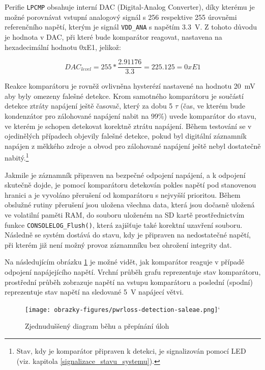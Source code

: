 Perifie \texttt{LPCMP} obsahuje interní DAC (Digital-Analog Converter), díky kterému je možné porovnávat vstupní analogový signál s 256 respektive 255 úrovněmi referenčního napětí, kterým je signál \texttt{VDD\_ANA} s napětím \SI{3.3}{\volt}. Z tohoto důvodu je hodnota v DAC, při které bude komparátor reagovat, nastavena na hexadecimální hodnotu 0xE1, jelikož:

\begin{equation}
    DAC_{level} = 255 * \frac{2.91176}{3.3} = 225.125 = 0xE1
    \label{eq:dac-value}
\end{equation}

Reakce komparátoru je rovněž ovlivněna hysterézí nastavené na hodnotu \SI{20}{\milli\volt} aby byly omezeny falešné detekce. Krom samotného komparátoru je součástí detekce ztráty napájení ještě časovač, který za dobu 5 $\tau$ (čas, ve kterém bude kondenzátor pro zálohované napájení nabit na $99\%$) uvede komparátor do stavu, ve kterém je schopen detekovat korektně ztrátu napájení. Během testování se v ojedinělých případech objevily falešné detekce, pokud byl digitální záznamník napájen z měkkého zdroje a obvod pro zálohované napájení ještě nebyl dostatečně nabitý.\footnote{Stav, kdy je komparátor připraven k detekci, je signalizován pomocí LED (viz. kapitola \ref{signalizace_stavu_systemu}).}

Jakmile je záznamník připraven na bezpečné odpojení napájení, a k odpojení skutečně dojde, je pomocí komparátoru detekován pokles napětí pod stanovenou hranici a je vyvoláno přerušení od komparátoru s nejvyšší prioritou. Během obslužné rutiny přerušení jsou uložena všechna data, která jsou dočasně uložená ve volatilní paměti RAM, do souboru uloženém na SD kartě prostřednictvím funkce \texttt{CONSOLELOG\_Flush()}, která zajišťuje také korektní uzavření souboru. Následně se systém dostává do stavu, kdy je připraven na nedostatečné napětí, při kterém již není možný provoz záznamníku bez ohrožení integrity dat.

Na následujícím obrázku \ref{fig:pwrloss-detection-saleae} je možné vidět, jak komparátor reaguje v případě odpojení napájejícího napětí. Vrchní průběh grafu reprezentuje stav komparátoru, prostřední průběh zobrazuje napětí na vstupu komparátoru a poslední (spodní) reprezentuje stav napětí na sledované \SI{5}{\volt} napájecí větvi.

\begin{figure}[h]
    \centering
    \texttt{[image: obrazky-figures/pwrloss-detection-saleae.png]}`
    
    \caption{Zjednuduššený diagram běhu a přepínání úloh}
    \label{fig:pwrloss-detection-saleae}
\end{figure}

